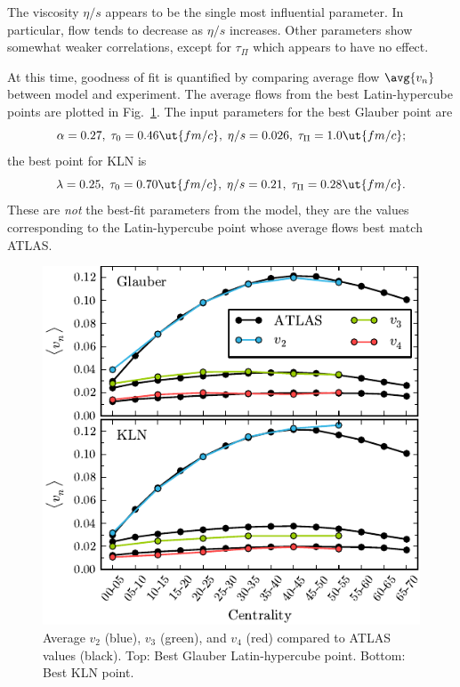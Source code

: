 \documentclass[reprint,amsmath]{revtex4-1}
\begin{document}
The viscosity $\eta/s$ appears to be the single most influential parameter.  In particular, flow tends to decrease as $\eta/s$ increases.
Other parameters show somewhat weaker correlations, except for $\tau_\Pi$ which appears to have no effect.

At this time, goodness of fit is quantified by comparing average flow $\avg{v_n}$ between model and experiment.  The average flows from the
best Latin-hypercube points are plotted in Fig.\ \ref{fig:bestavg}.  The input parameters for the best Glauber point are
\begin{equation*}
  \alpha = 0.27,\;
  \tau_0 = 0.46 \ut{fm/c},\;
  \eta/s = 0.026,\;
  \tau_\Pi = 1.0 \ut{fm/c};
\end{equation*}
the best point for KLN is
\begin{equation*}
  \lambda = 0.25,\;
  \tau_0 = 0.70 \ut{fm/c},\;
  \eta/s = 0.21,\;
  \tau_\Pi = 0.28 \ut{fm/c}.
\end{equation*}
These are \emph{not} the best-fit parameters from the model, they are the values corresponding to the Latin-hypercube point whose average
flows best match ATLAS.

\begin{figure}[b]
  \centering
  \includegraphics{bestavg}
  \caption{Average $v_2$ (blue), $v_3$ (green), and $v_4$ (red) compared to ATLAS values (black). Top:  Best Glauber Latin-hypercube point.
  Bottom:  Best KLN point.}
  \label{fig:bestavg}
\end{figure}
\end{document}
